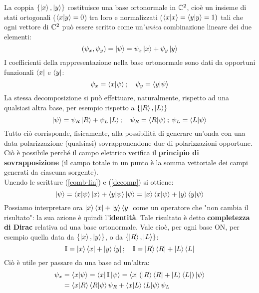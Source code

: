 \documentclass[FisicaTeorica.tex]{subfiles}
\begin{document}
La coppia $\{\ket{x},\ket{y}\}$ costituisce una base ortonormale in $\mathbb{C}^2$, cioè un insieme di stati ortogonali ($\braket{x|y} = 0$) tra loro e normalizzati ($\braket{x|x} = \braket{y|y} = 1)$ tali che ogni vettore di $\mathbb{C}^2$ può essere scritto come un'\textit{unica} combinazione lineare dei due elementi:
\begin{equation}
    (\psi_x, \psi_y) = \ket{\psi} = \psi_x \ket{x} + \psi_y \ket{y}
    \label{comb-lin}
\end{equation} %
I coefficienti della rappresentazione nella base ortonormale sono dati da opportuni funzionali $\bra{x}$ e $\bra{y}$:
\[
\psi_x = \braket{x|\psi}; \quad \psi_y = \braket{y|\psi}
\label{decomp}
\]
La stessa decomposizione si può effettuare, naturalmente, rispetto ad una qualsiasi altra base, per esempio rispetto a $\{\ket{R}, \ket{L}\}$
\[
\ket{\psi} = \psi_R \ket{R} + \psi_L \ket{L}; \quad \psi_R = \braket{R|\psi}; \> \psi_L = \braket{L|\psi}
\]
Tutto ciò corrisponde, fisicamente, alla possibilità di generare un'onda con una data polarizzazione (qualsiasi) sovrapponendone due di polarizzazioni opportune. Ciò è possibile perché il campo elettrico verifica il \textbf{principio di sovrapposizione} (il campo totale in un punto è la somma vettoriale dei campi generati da ciascuna sorgente).\\
Unendo le scritture (\ref{comb-lin}) e (\ref{decomp}) si ottiene:
\[
\ket{\psi} = \braket{x|\psi}\ket{x} + \braket{y|\psi}\ket{\psi} = \ket{x}\braket{x|\psi} + \ket{y}\braket{y|\psi}
\]
Possiamo interpretare ora $\ket{x}\bra{x} + \ket{y}\bra{y}$ come un operatore che "non cambia il risultato": la sua azione è quindi l'\textbf{identità}. Tale risultato è detto \textbf{completezza di Dirac} relativa ad una base ortonormale. Vale cioè, per ogni base ON, per esempio quella data da $\{\ket{x}, \ket{y}\}$, o da $\{\ket{R}, \ket{L}\}$:
\[
\mathbb{I} = \ket{x}\bra{x} + \ket{y}\bra{y}; \quad \mathbb{I} = \ket{R}\bra{R} + \ket{L}\bra{L}
\]
Ciò è utile per passare da una base ad un'altra:
\begin{align*}
\psi_x &= \braket{x|\psi} = \bra{x}\mathbb{I}\ket{\psi} = \bra{x} (\ket{R}\bra{R} + \ket{L}\bra{L}) \ket{\psi}\\ &= \braket{x|R}\braket{R|\psi}\psi_R + \braket{x|L}\braket{L|\psi}\psi_L
\end{align*}
\end{document}
